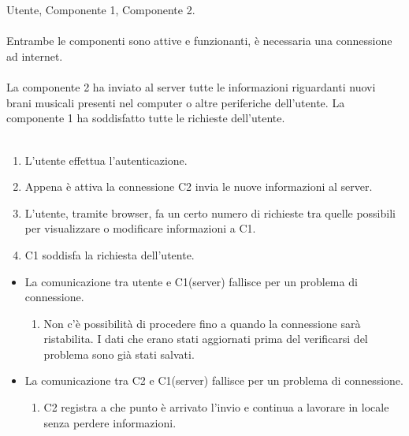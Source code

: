 \newpage
\vspace*{0.5cm}
\\\\
 Utente, Componente 1, Componente 2. \\\\
 Entrambe le componenti sono attive e funzionanti, \`e
necessaria una connessione ad internet. \\\\ 
 La componente 2 ha inviato al server tutte le
informazioni riguardanti nuovi brani musicali presenti nel computer o altre
periferiche dell'utente. La componente 1 ha soddisfatto tutte le richieste
dell'utente. \\\\ 
\begin{enumerate}
  \item L'utente effettua l'autenticazione.
  \item Appena \`e attiva la connessione C2 invia le nuove informazioni al server.
  \item L'utente, tramite browser, fa un certo numero di richieste tra quelle
  possibili per visualizzare o modificare informazioni a C1.
  \item C1 soddisfa la richiesta dell'utente.
\end{enumerate}
\begin{itemize}
  \item La comunicazione tra utente e C1(server) fallisce per un problema di
  connessione.
  \begin {enumerate}
    \item Non c'\`e possibilit\`a di procedere fino a quando la connessione sar\`a
    ristabilita. I dati che erano stati aggiornati prima del verificarsi del
    problema sono gi\`a stati salvati.
  \end{enumerate}
  \item La comunicazione tra C2 e C1(server) fallisce per un problema di
  connessione.
  \begin {enumerate}
    \item C2 registra a che punto \`e arrivato l'invio e continua a lavorare in
    locale senza perdere informazioni.
  \end{enumerate}
\end{itemize}
\newpage


